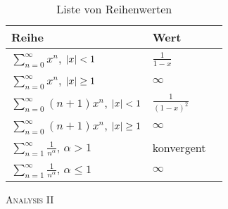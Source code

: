 \documentclass[a4paper]{article}
\theoremstyle{marginbreak}
\begin{document}
\begin{multicols}{2}
\begin{table}[H]
\begin{tabular}{ | M{3.5cm} | M{3.5cm} | N}
				\hline
				Reihe & Wert & \\[0.6cm] \hline \hline
				$\sum\limits_{n=0}^\infty x^n$, $\abs{x}<1$ & $\frac{1}{1-x}$ & \\[0.6cm] \hline
				$\sum\limits_{n=0}^\infty x^n$, $\abs{x}\geq1$ & $\infty$ & \\[0.6cm] \hline \hline
				$\sum\limits_{n=0}^\infty (n+1)x^n$, $\abs{x}<1$ & $\frac{1}{(1-x)^2}$ & \\[0.6cm] \hline
				$\sum\limits_{n=0}^\infty (n+1)x^n$, $\abs{x}\geq1$ & $\infty$ & \\[0.6cm] \hline \hline
				$\sum\limits_{n=1}^\infty\frac{1}{n^\alpha}$, $\alpha > 1$ & konvergent & \\[0.6cm] \hline
				$\sum\limits_{n=1}^\infty\frac{1}{n^\alpha}$, $\alpha \leq 1$ & $\infty$ & \\[0.6cm] \hline
			\end{tabular}
			\caption{Liste von Reihenwerten}
		\end{table}
	\end{multicols}
	\newpage
	\textsc{Analysis II}
\end{document}
